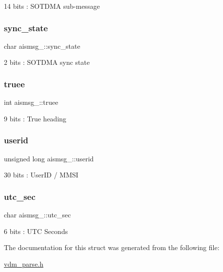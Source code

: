 14 bits \+: S\+O\+T\+D\+MA sub-\/message 

\mbox{\label{structaismsg__1_a3124bb3fe2b89616922d84e0d0172c2c}} 
\subsubsection{\texorpdfstring{sync\+\_\+state}{sync\_state}}
{\footnotesize\ttfamily char aismsg\+\_\+::sync\+\_\+state}



2 bits \+: S\+O\+T\+D\+MA sync state 

\mbox{\label{structaismsg__1_ae98ca0e4721cb6a8e796079581e44cf7}} 
\subsubsection{\texorpdfstring{truee}{truee}}
{\footnotesize\ttfamily int aismsg\+\_\+::truee}



9 bits \+: True heading 

\mbox{\label{structaismsg__1_a896ad74aef1c82a466b820f678783b60}} 
\subsubsection{\texorpdfstring{userid}{userid}}
{\footnotesize\ttfamily unsigned long aismsg\+\_\+::userid}



30 bits \+: User\+ID / M\+M\+SI 

\mbox{\label{structaismsg__1_a65eebaa7af12655f55f92e9d3adabb0c}} 
\subsubsection{\texorpdfstring{utc\+\_\+sec}{utc\_sec}}
{\footnotesize\ttfamily char aismsg\+\_\+::utc\+\_\+sec}



6 bits \+: U\+TC Seconds 



The documentation for this struct was generated from the following file\+:\begin{DoxyCompactItemize}
\item 
\mbox{\hyperlink{vdm__parse_8h}{vdm\+\_\+parse.\+h}}\end{DoxyCompactItemize}
